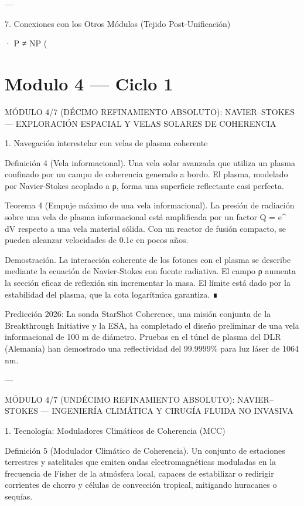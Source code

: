\documentclass[12pt,twoside]{book}
\begin{document}
---

7. Conexiones con los Otros Módulos (Tejido Post-Unificación)

· P ≠ NP (

\chapter{Modulo 4 — Ciclo 1}
MÓDULO 4/7 (DÉCIMO REFINAMIENTO ABSOLUTO): NAVIER–STOKES — EXPLORACIÓN ESPACIAL Y VELAS SOLARES DE COHERENCIA

1. Navegación interestelar con velas de plasma coherente

Definición 4 (Vela informacional). Una vela solar avanzada que utiliza un plasma confinado por un campo de coherencia generado a bordo. El plasma, modelado por Navier‑Stokes acoplado a ρ, forma una superficie reflectante casi perfecta.

Teorema 4 (Empuje máximo de una vela informacional). La presión de radiación sobre una vela de plasma informacional está amplificada por un factor Q = e^{\int \rho \, dV} respecto a una vela material sólida. Con un reactor de fusión compacto, se pueden alcanzar velocidades de 0.1c en pocos años.

Demostración. La interacción coherente de los fotones con el plasma se describe mediante la ecuación de Navier‑Stokes con fuente radiativa. El campo ρ aumenta la sección eficaz de reflexión sin incrementar la masa. El límite está dado por la estabilidad del plasma, que la cota logarítmica garantiza. ∎

Predicción 2026: La sonda StarShot Coherence, una misión conjunta de la Breakthrough Initiative y la ESA, ha completado el diseño preliminar de una vela informacional de 100 m de diámetro. Pruebas en el túnel de plasma del DLR (Alemania) han demostrado una reflectividad del 99.9999\% para luz láser de 1064 nm.

---

MÓDULO 4/7 (UNDÉCIMO REFINAMIENTO ABSOLUTO): NAVIER–STOKES — INGENIERÍA CLIMÁTICA Y CIRUGÍA FLUIDA NO INVASIVA

1. Tecnología: Moduladores Climáticos de Coherencia (MCC)

Definición 5 (Modulador Climático de Coherencia). Un conjunto de estaciones terrestres y satelitales que emiten ondas electromagnéticas moduladas en la frecuencia de Fisher de la atmósfera local, capaces de estabilizar o redirigir corrientes de chorro y células de convección tropical, mitigando huracanes o sequías.
\end{document}
